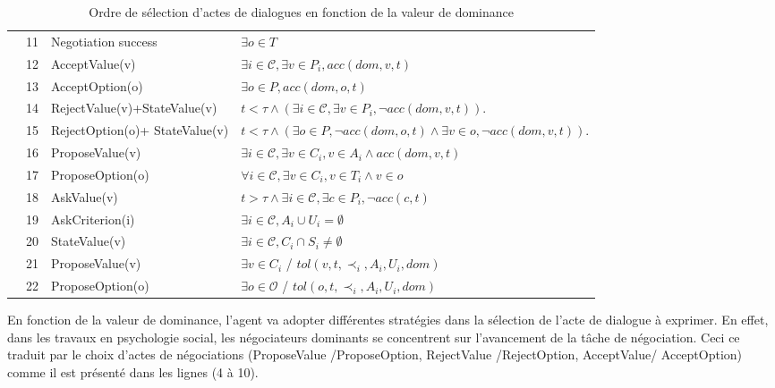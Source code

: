 \begin{table}[!t]
\begin{tabular}{|p{.5cm}|p{.9cm}|p{3.6cm}|p{7.6cm}|}
			\hline
			
			\parbox[t]{2mm}{
				} & 11& Negotiation success &  $\exists o \in T$ \\
			&12& AcceptValue(v) & $\exists i\in\mathcal{C}, \exists v \in P_i, acc(dom, v, t)$ \\
			&13&AcceptOption(o) & $\exists o \in P, acc(dom, o, t)$ \\
			&14&RejectValue(v)+\newline StateValue(v) & $ t<\tau \land (\exists i\in\mathcal{C}, \exists v \in P_i, \neg acc(dom,v, t))$.\\
			&15&RejectOption(o)+ \newline StateValue(v) & $ t<\tau \land (\exists o \in P,  \neg acc(dom,o, t) \land \exists v \in o, \neg acc(dom,v, t))$.\\
			&16&ProposeValue(v) &  $\exists i\in\mathcal{C}, \exists v \in C_i, v \in A_i  \land acc(dom, v, t) $\\
			&17&ProposeOption(o)  & $\forall i\in\mathcal{C},\exists v \in C_i, v \in T_i  \land v \in o$ \\
			&18&AskValue(v) & $t > \tau \land \exists i\in\mathcal{C}, \exists c \in P_i, \neg acc(c, t)$ \\
			&19&AskCriterion(i) & $\exists i\in\mathcal{C}, A_i \cup U_i= \emptyset $\\
			&20&StateValue(v) & $\exists i\in\mathcal{C}, C_i\cap S_i \neq \emptyset$	\\
			&21& ProposeValue(v) & $\exists v \in C_i$ / $tol(v, t, \prec_i, A_i, U_i, dom)$\\
			&22& ProposeOption(o) & $\exists o \in \mathcal{O}$ / $tol(o, t, \prec_i, A_i, U_i, dom)$\\
			
			\hline
		\end{tabular}
		
		\caption{Ordre de sélection d'actes de dialogues en fonction de la valeur de dominance}
		\label{table:uttChoice}
	\end{table}
	
	En fonction de la valeur de dominance, l'agent va adopter différentes stratégies dans la sélection de l'acte de dialogue à exprimer. En effet, dans les travaux en psychologie social, les négociateurs dominants se concentrent sur l'avancement de la tâche de négociation. Ceci ce traduit par le choix d'actes de négociations (ProposeValue /ProposeOption, RejectValue /RejectOption, AcceptValue/ AcceptOption) comme il est présenté dans les lignes (4 à 10).
	
